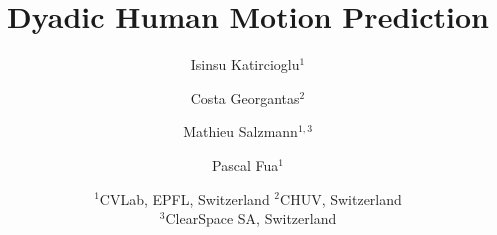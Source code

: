 \documentclass[10pt,twocolumn,letterpaper]{article}
\begin{document}
\title{Dyadic Human Motion Prediction}

\author{
	Isinsu Katircioglu$^1$
	\and
	Costa Georgantas$^2$
	\and
	Mathieu Salzmann$^{1,3}$
	\and
	Pascal Fua$^1$   
	\and
	$^1$CVLab, EPFL, Switzerland\quad
	$^2$CHUV, Switzerland\\
	$^3$ClearSpace SA, Switzerland
}

\maketitle









{\small


}
\end{document}
